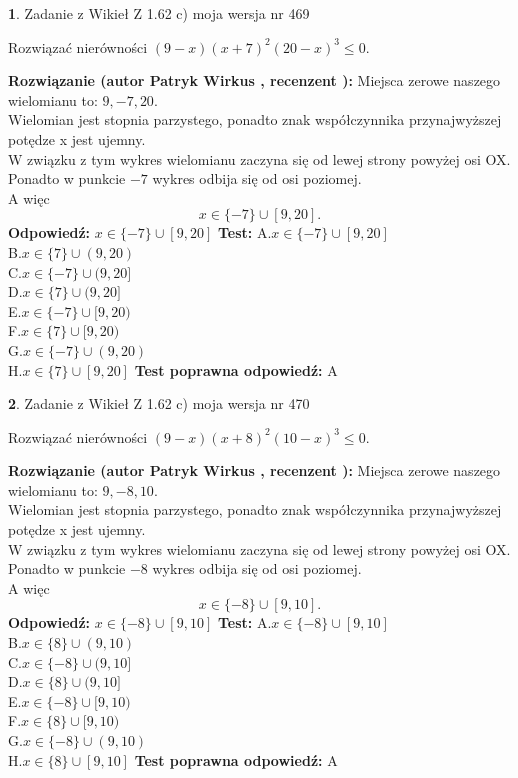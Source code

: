 \documentclass[12pt, a4paper]{article}
\theoremstyle{definition} %
\newtheorem{zad}{}
\newcommand{\zadStart}[1]{\begin{zad}#1\newline}
\newcommand{\zadStop}{\end{zad}}
\newcommand{\rozwStart}[2]{\noindent \textbf{Rozwiązanie (autor #1 , recenzent #2): }\newline}
\newcommand{\rozwStop}{\newline}
\newcommand{\odpStart}{\noindent \textbf{Odpowiedź:}\newline}
\newcommand{\odpStop}{\newline}
\newcommand{\testStart}{\noindent \textbf{Test:}\newline}
\newcommand{\testStop}{\newline}
\newcommand{\kluczStart}{\noindent \textbf{Test poprawna odpowiedź:}\newline}
\newcommand{\kluczStop}{\newline}
\begin{document}
\zadStart{Zadanie z Wikieł Z 1.62 c) moja wersja nr 469}

Rozwiązać nierówności $(9-x)(x+7)^{2}(20-x)^{3}\le0$.
\zadStop
\rozwStart{Patryk Wirkus}{}
Miejsca zerowe naszego wielomianu to: $9, -7, 20$.\\
Wielomian jest stopnia parzystego, ponadto znak współczynnika przy\linebreak najwyższej potędze x jest ujemny.\\ W związku z tym wykres wielomianu zaczyna się od lewej strony powyżej osi OX.\\
Ponadto w punkcie $-7$ wykres odbija się od osi poziomej.\\
A więc $$x \in \{-7\} \cup [9,20].$$
\rozwStop
\odpStart
$x \in \{-7\} \cup [9,20]$
\odpStop
\testStart
A.$x \in \{-7\} \cup [9,20]$\\
B.$x \in \{7\} \cup (9,20)$\\
C.$x \in \{-7\} \cup (9,20]$\\
D.$x \in \{7\} \cup (9,20]$\\
E.$x \in \{-7\} \cup [9,20)$\\
F.$x \in \{7\} \cup [9,20)$\\
G.$x \in \{-7\} \cup (9,20)$\\
H.$x \in \{7\} \cup [9,20]$
\testStop
\kluczStart
A
\kluczStop



\zadStart{Zadanie z Wikieł Z 1.62 c) moja wersja nr 470}

Rozwiązać nierówności $(9-x)(x+8)^{2}(10-x)^{3}\le0$.
\zadStop
\rozwStart{Patryk Wirkus}{}
Miejsca zerowe naszego wielomianu to: $9, -8, 10$.\\
Wielomian jest stopnia parzystego, ponadto znak współczynnika przy\linebreak najwyższej potędze x jest ujemny.\\ W związku z tym wykres wielomianu zaczyna się od lewej strony powyżej osi OX.\\
Ponadto w punkcie $-8$ wykres odbija się od osi poziomej.\\
A więc $$x \in \{-8\} \cup [9,10].$$
\rozwStop
\odpStart
$x \in \{-8\} \cup [9,10]$
\odpStop
\testStart
A.$x \in \{-8\} \cup [9,10]$\\
B.$x \in \{8\} \cup (9,10)$\\
C.$x \in \{-8\} \cup (9,10]$\\
D.$x \in \{8\} \cup (9,10]$\\
E.$x \in \{-8\} \cup [9,10)$\\
F.$x \in \{8\} \cup [9,10)$\\
G.$x \in \{-8\} \cup (9,10)$\\
H.$x \in \{8\} \cup [9,10]$
\testStop
\kluczStart
A
\kluczStop
\end{document}
